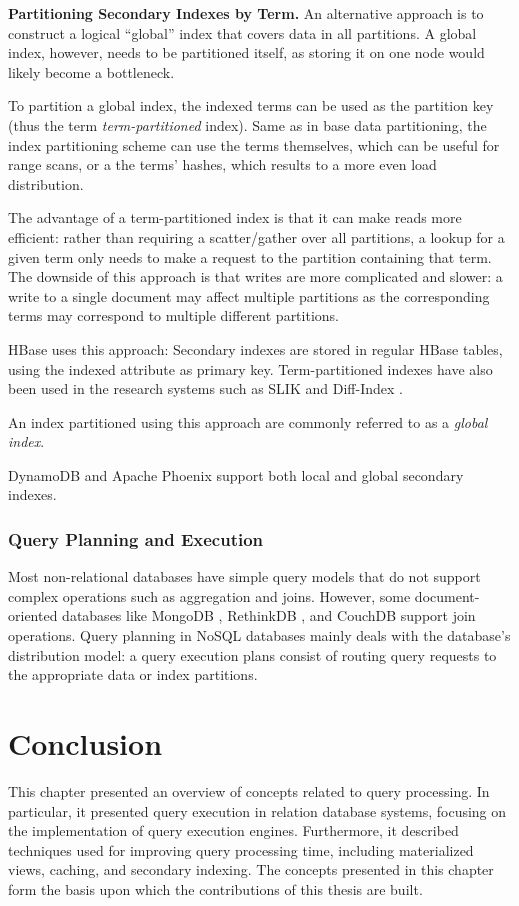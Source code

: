 \bigskip
\noindent
\textbf{Partitioning Secondary Indexes by Term.}
An alternative approach is to construct a logical ``global'' index that covers data in all partitions.
A global index, however, needs to be partitioned itself, as storing it on one node would likely become a bottleneck.

To partition a global index, the indexed terms can be used as the partition key (thus the term \textit{term-partitioned}
index).
Same as in base data partitioning, the index partitioning scheme can use the terms themselves, which can be useful for
range scans, or a the terms' hashes, which results to a more even load distribution.

The advantage of a term-partitioned index is that it can make reads more efficient:
rather than requiring a scatter/gather over all partitions, a lookup for a given term only needs to make a request to the
partition containing that term.
The downside of this approach is that writes are more complicated and slower:
a write to a single document may affect multiple partitions as the corresponding terms may correspond to multiple
different partitions.

HBase \cite{hbase:secondaryindexes} uses this approach:
Secondary indexes are stored in regular HBase tables, using the indexed attribute as primary key.
Term-partitioned indexes have also been used in the research systems such as SLIK \cite{kejriwal:slik}
and Diff-Index \cite{tan:diffindex}.

An index partitioned using this approach are commonly referred to as a \textit{global index}.

\medskip
\noindent
DynamoDB \cite{dynamodb:secondaryindexes} and Apache Phoenix \cite{phoenix:secondaryidnexing} support both local and global secondary indexes.

\subsubsection{Query Planning and Execution}

Most non-relational databases have simple query models that do not support complex operations such as aggregation and
joins.
However, some document-oriented databases like MongoDB \cite{mongodb:joins}, RethinkDB \cite{rethinkdb:joins},
and CouchDB \cite{couchdb:joins} support join operations.
Query planning in NoSQL databases mainly deals with the database's distribution model:
a query execution plans consist of routing query requests to the appropriate data or index partitions.


\section{Conclusion}
This chapter presented an overview of concepts related to query processing.
In particular, it presented query execution in relation database systems,
focusing on the implementation of query execution engines.
Furthermore, it described techniques used for improving query processing time,
including materialized views, caching, and secondary indexing.
The concepts presented in this chapter form the basis upon which the contributions of this thesis are built.